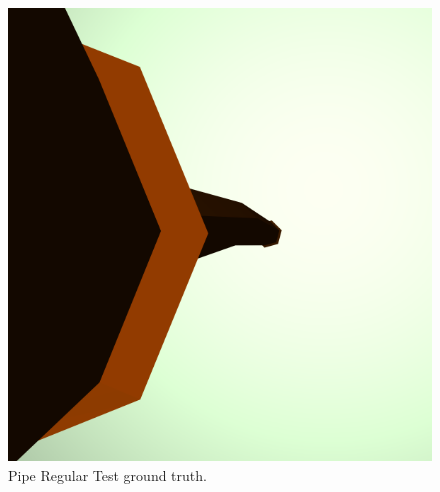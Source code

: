 \documentclass{cslthse-msc}
\begin{document}
\begin{figure}[H]
	\centering
	\includegraphics[scale=0.2]{images/results/pipe_regular_sobel_ground_truth.png}
	\caption{Pipe Regular Test ground truth.}\label{fig:pipe_regular_truth}
\end{figure}
\end{document}
